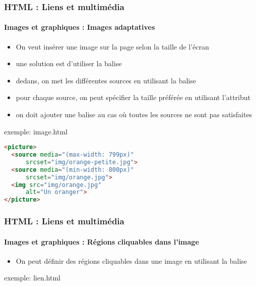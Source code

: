 \documentclass[xcolor=table]{beamer}
\begin{document}
\begin{frame}[fragile]
\frametitle{HTML : Liens et multimédia}
\framesubtitle{Images et graphiques : Images adaptatives}

\begin{minipage}{0.50\textwidth} 
	\begin{itemize}
		\item On veut insérer une image sur la page selon la taille de l'écran
		\item une solution est d'utiliser la balise 
		\item dedans, on met les différentes sources en utilisant la balise 
		\item pour chaque source, on peut spécifier la taille préférée en utilisant l'attribut 
		\item on doit ajouter une balise  au cas où toutes les sources ne sont pas satisfaites
	\end{itemize}
\end{minipage}
%
\begin{minipage}{0.49\textwidth}
\begin{exampleblock}{exemple: image.html}
\lstset{escapeinside=**}
\scriptsize\bfseries\vspace{-6pt}
\begin{lstlisting}[language={html}]
<picture>
  <source media="(max-width: 799px)" 
      srcset="img/orange-petite.jpg">
  <source media="(min-width: 800px)" 
      srcset="img/orange.jpg">
  <img src="img/orange.jpg" 
      alt="Un oranger">
</picture>
\end{lstlisting}\vspace{-6pt}
\end{exampleblock}
\end{minipage}

\end{frame}

\begin{frame}[fragile]
\frametitle{HTML : Liens et multimédia}
\framesubtitle{Images et graphiques : Régions cliquables dans l'image}

\begin{minipage}{0.50\textwidth} 
	\begin{itemize}
		\item On peut définir des régions cliquables dans une image en utilisant la balise 
	\end{itemize}
\end{minipage}
%
\begin{minipage}{0.49\textwidth}
	\begin{exampleblock}{exemple: lien.html}
		\lstset{escapeinside=**}
		\scriptsize\bfseries\vspace{-6pt}
		\begin{lstlisting}[language={html}]
		
		\end{lstlisting}\vspace{-6pt}
	\end{exampleblock}
\end{minipage}

\end{frame}
\end{document}

